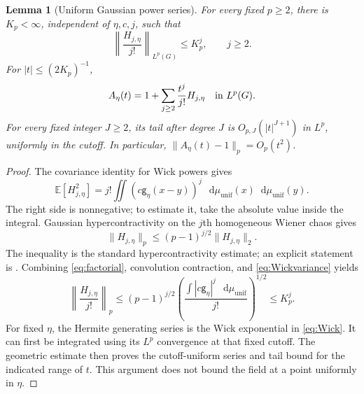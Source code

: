 \documentclass[11pt,reqno]{amsart}
\numberwithin{equation}{section}
\theoremstyle{plain}
\newtheorem{lemma}[lemma]{Lemma}
\theoremstyle{definition}
\newcommand{\dd}{\mathop{}\!\mathrm d}
\newcommand{\E}{\mathbb E}
\newcommand{\g}{\mathsf g}
\newcommand{\muunif}{\mu_{\mathrm{unif}}}
\begin{document}
\begin{lemma}[Uniform Gaussian power series]\label{lem:Wickseries}
For every fixed $p\geq2$, there is $K_p<\infty$, independent of $\eta,c,j$, such that
\begin{equation}\label{eq:Wickbound}
 \left\|\frac{H_{j,\eta}}{j!}\right\|_{L^p(G)}\leq K_p^j,
 \qquad j\geq2.
\end{equation}
For $|t|\leq(2K_p)^{-1}$,
\begin{equation}\label{eq:Wickseries}
 A_\eta(t)=1+\sum_{j\geq2}\frac{t^j}{j!}H_{j,\eta}
 \quad\hbox{in }L^p(G).
\end{equation}
For every fixed integer $J\geq2$, its tail after degree $J$ is $O_{p,J}(|t|^{J+1})$ in $L^p$, uniformly in the cutoff. In particular, $\|A_\eta(t)-1\|_p=O_p(t^2)$.
\end{lemma}
\begin{proof}
The covariance identity for Wick powers gives
\begin{equation}\label{eq:Wickvariance}
 \E[H_{j,\eta}^2]
 =j!\iint (c \g_\eta(x-y))^j\,\dd \muunif(x)\dd \muunif(y).
\end{equation}
The right side is nonnegative; to estimate it, take the absolute value inside the integral. Gaussian hypercontractivity on the $j$th homogeneous Wiener chaos gives
\begin{equation}\label{eq:hyper}
 \|H_{j,\eta}\|_p\leq(p-1)^{j/2}\|H_{j,\eta}\|_2.
\end{equation}
The inequality is the standard hypercontractivity estimate; an explicit statement is \cite[Proposition~2.6]{NourdinPeccatiReinert2010}. Combining \eqref{eq:factorial}, convolution contraction, and \eqref{eq:Wickvariance} yields
\begin{equation}\label{eq:geometric}
 \left\|\frac{H_{j,\eta}}{j!}\right\|_p
 \leq (p-1)^{j/2}
       \left(\frac{\int|c \g_\eta|^j\,\dd \muunif}{j!}\right)^{1/2}
 \leq K_p^j.
\end{equation}
For fixed $\eta$, the Hermite generating series is the Wick exponential in \eqref{eq:Wick}. It can first be integrated using its $L^p$ convergence at that fixed cutoff. The geometric estimate then proves the cutoff-uniform series and tail bound for the indicated range of $t$. This argument does not bound the field at a point uniformly in $\eta$.
\end{proof}
\end{document}
